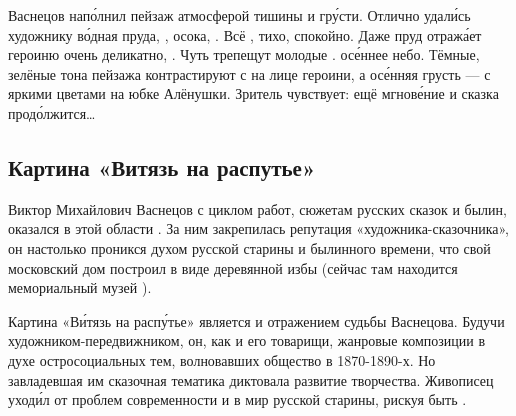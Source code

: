 Васнецов нап\'{о}лнил  пейзаж атмосферой тишины и гр\'{у}сти.
Отлично удал\'{и}сь художнику в\'{о}дная  пруда, , осока, .
Всё , тихо, спокойно.
Даже пруд отраж\'{а}ет героиню очень деликатно, .
Чуть трепещут молодые .   ос\'{е}ннее небо.
Тёмные, зелёные тона пейзажа контрастируют с  на лице героини, а ос\'{е}нняя грусть --- с яркими цветами на юбке Алёнушки. Зритель чувствует: ещё мгнов\'{е}ние и сказка прод\'{о}лжится\dots







\subsection{Картина «Витязь на распутье»}

Виктор Михайлович Васнецов с циклом работ,  сюжетам русских сказок и былин, оказался  в этой области . За ним закрепилась репутация «художника-сказочника», он настолько проникся духом русской старины и былинного времени, что свой московский дом построил в виде деревянной избы (сейчас там находится мемориальный музей ).

Картина «В\'{и}тязь на расп\'{у}тье»  является и отражением судьбы Васнецова.
Будучи  художником-передвижником, он, как и его товарищи,  жанровые композиции в духе остросоциальных тем, волновавших общество в 1870-1890-х.
Но завладевшая им сказочная тематика диктовала  развитие творчества. Живописец уход\'{и}л от проблем современности и  в мир русской старины, рискуя быть .

